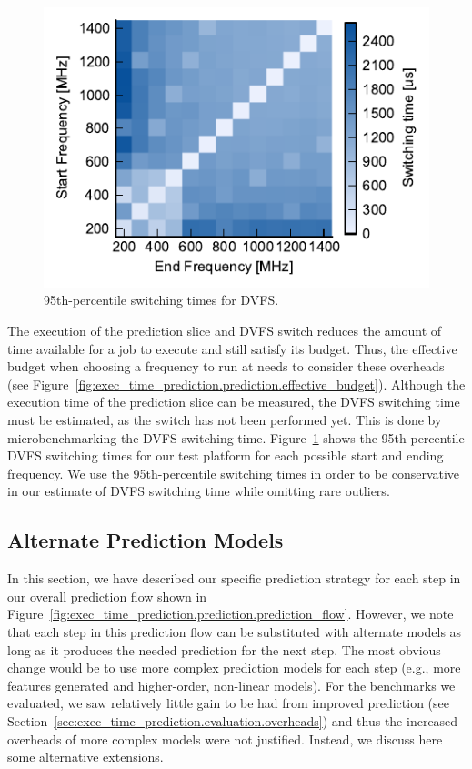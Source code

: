 \begin{figure}
  \begin{center}
    \includegraphics{exec_time_prediction/data/dvfs_heatmap.pdf}
    \caption{95th-percentile switching times for DVFS.}
    \label{fig:exec_time_prediction.prediction.dvfs_heatmap}
  \end{center}
\end{figure}

The execution of the prediction slice and DVFS switch reduces the amount of
time available for a job to execute and still satisfy its budget. Thus, the
effective budget when choosing a frequency to run at needs to consider these
overheads (see
Figure~\ref{fig:exec_time_prediction.prediction.effective_budget}). Although
the execution time of the prediction slice can be measured, the DVFS switching
time must be estimated, as the switch has not been performed yet.  This is done
by microbenchmarking the DVFS switching time.
Figure~\ref{fig:exec_time_prediction.prediction.dvfs_heatmap} shows the
95th-percentile DVFS switching times for our test platform for each possible
start and ending frequency. We use the 95th-percentile switching times in order
to be conservative in our estimate of DVFS switching time while omitting rare
outliers. 

\subsection{Alternate Prediction Models}
\label{sec:exec_time_prediction.prediction.alternate_models}

In this section, we have described our specific prediction strategy for each
step in our overall prediction flow shown in
Figure~\ref{fig:exec_time_prediction.prediction.prediction_flow}. However, we
note that each step in this prediction flow can be substituted with alternate
models as long as it produces the needed prediction for the next step.  The
most obvious change would be to use more complex prediction models for each
step (e.g., more features generated and higher-order, non-linear models).  For
the benchmarks we evaluated, we saw relatively little gain to be had from
improved prediction (see
Section~\ref{sec:exec_time_prediction.evaluation.overheads}) and thus the
increased overheads of more complex models were not justified.  Instead, we
discuss here some alternative extensions.

